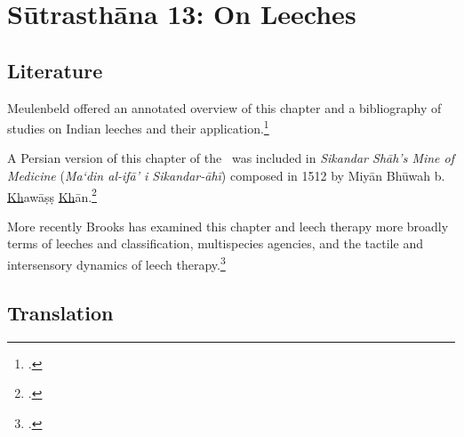 

\chapter{Sūtrasthāna 13:  On Leeches}


\section{Literature} 


Meulenbeld offered an annotated overview of this chapter and a bibliography
of studies on Indian leeches and their application.\footcite[IA, 209; IB,
324, n.\,131]{meul-hist}

A Persian version of this chapter of the \SS\ was included in \emph{Sikandar
    Shāh's Mine of Medicine} (\emph{Ma`din al-ifā' i
    Sikandar-āhī}) composed in 1512 by Miyān Bhūwah b.
\underline{Kh}awāṣṣ \underline{Kh}ān.\footcites[96--109]{sidd-1959}
{azee-1971} [231--232]{stor-1971} [IB, 324,
n.\,128]{meul-hist}[8--9]{spez-2019}

More recently Brooks has examined this chapter and leech therapy more 
broadly terms of leeches and classification, multispecies agencies, and the 
tactile and intersensory dynamics of leech therapy.\footcite{%
    broo-2020,
    broo-2020b,
    broo-2020c,
    broo-2021}

\section{Translation}

